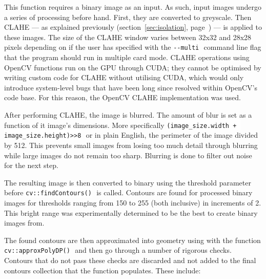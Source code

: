 \documentclass[a4paper,12pt,notitlepage]{article}
\newcommand{\secref}[1]{(section~\ref{#1}, page~\pageref{#1})}
\newcommand{\code}[1]{\colorbox{white}{\lstinline[basicstyle=\ttfamily\color{black}]|#1|} }
\begin{document}
			This function requires a binary image as an input. As such, input images undergo a series of processing before hand. First, they are converted to greyscale. Then CLAHE --- as explained previously \secref{sec:isolation} --- is applied to these images. The size of the CLAHE window varies between 32x32 and 28x28 pixels depending on if the user has specified with the \code{--multi} command line flag that the program should run in multiple card mode. CLAHE operations using OpenCV functions run on the GPU through CUDA; they cannot be optimised by writing custom code for CLAHE without utilising CUDA, which would only introduce system-level bugs that have been long since resolved within OpenCV's code base. For this reason, the OpenCV CLAHE implementation was used.


			After performing CLAHE, the image is blurred. The amount of blur is set as a function of it image's dimensions. More specifically \code{(image_size.width + image_size.height)>>8} or in plain English, the perimeter of the image divided by 512. This prevents small images from losing too much detail through blurring while large images do not remain too sharp. Blurring is done to filter out noise for the next step.

			The resulting image is then converted to binary using the threshold parameter before \code{cv::findContours()} is called. Contours are found for processed binary images for thresholds ranging from 150 to 255 (both inclusive) in increments of 2. This bright range was experimentally determined to be the best to create binary images from.

			The found contours are then approximated into geometry using with the function \code{cv::approxPolyDP()} and then go through a number of rigorous checks. Contours that do not pass these checks are discarded and not added to the final contours collection that the function populates. These include:
\end{document}
